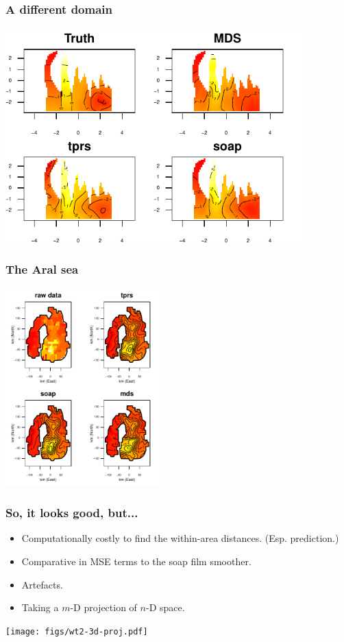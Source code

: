\documentclass[ignorenonframetext]{beamer} %
\newcommand{\bi}{\begin{itemize}}
\newcommand{\ei}{\end{itemize}}
\begin{document}

\begin{frame}
	\frametitle{A different domain}
            \centering
              \includegraphics[width=4.5in]{figs/wt2-real.pdf}\\
\end{frame}

\begin{frame}
	\frametitle{The Aral sea}
            \centering
              \includegraphics[height=3in]{figs/aral-fit.pdf}\\
\end{frame}

\begin{frame}
	\frametitle{So, it looks good, but...}
          \bi
            \item Computationally costly to find the within-area distances. (Esp. prediction.)
            \item Comparative in MSE terms to the soap film smoother.
            \item Artefacts.
            \item Taking a $m$-D projection of $n$-D space.
           \ei
            \centering
              \texttt{[image: figs/wt2-3d-proj.pdf]}\\           
\end{frame}
\end{document}
